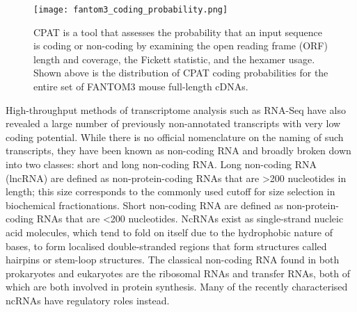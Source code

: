 \begin{figure}[!ht]
   \centering
   \texttt{[image: fantom3\_coding\_probability.png]}
   \caption[Coding probability of FANTOM3 mouse cDNAs]{CPAT is a tool that assesses the probability that an input sequence is coding or non-coding by examining the open reading frame (ORF) length and coverage, the Fickett statistic\cite{pmid7145702}, and the hexamer usage. Shown above is the distribution of CPAT coding probabilities for the entire set of FANTOM3 mouse full-length cDNAs\cite{tang2014fantom3codingprob}.}
   \label{fig:fantom3_coding_prob}
\end{figure}

High-throughput methods of transcriptome analysis such as RNA-Seq have also revealed a large number of previously non-annotated transcripts with very low coding potential. While there is no official nomenclature on the naming of such transcripts, they have been known as non-coding RNA and broadly broken down into two classes: short and long non-coding RNA. Long non-coding RNA (lncRNA) are defined as non-protein-coding RNAs that are \textgreater200 nucleotides in length; this size corresponds to the commonly used cutoff for size selection in biochemical fractionations. Short non-coding RNA are defined as non-protein-coding RNAs that are \textless200 nucleotides. NcRNAs exist as single-strand nucleic acid molecules, which tend to fold on itself due to the hydrophobic nature of bases, to form localised double-stranded regions that form structures called hairpins or stem-loop structures. The classical non-coding RNA found in both prokaryotes and eukaryotes are the ribosomal RNAs and transfer RNAs, both of which are both involved in protein synthesis. Many of the recently characterised ncRNAs have regulatory roles instead\cite{pmid24776770}.

